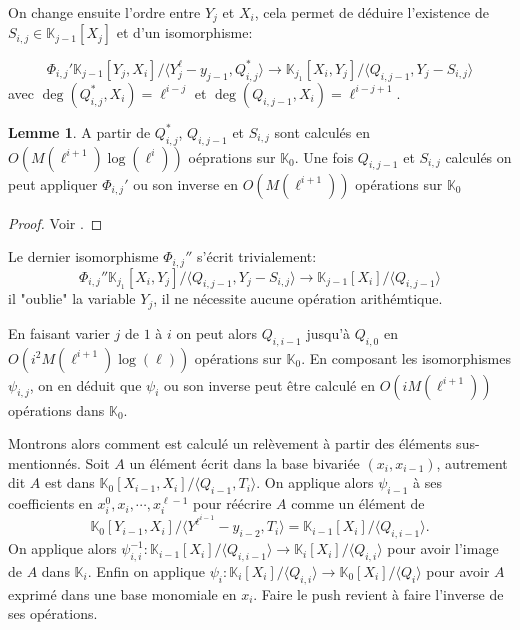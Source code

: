 \documentclass[10pt,a4paper]{book}
\theoremstyle{plain}
\theoremstyle{definition}
\newtheorem{lem}[thm]{Lemme}
\theoremstyle{definition}
\theoremstyle{definition}
\theoremstyle{definition}
\theoremstyle{remark}
\theoremstyle{remark}
\begin{document}
On change ensuite l'ordre entre $Y_j$ et $X_i$, cela permet de déduire l'existence de $S_{i,j} \in \mathbb{K}_{j-1}[X_j]$ et d'un isomorphisme:

\begin{equation*}
\Phi_{i,j}' \mathbb{K}_{j-1}[Y_j,X_i]/ \langle Y_j^{\ell}-y_{j-1},Q_{i,j}^* \rangle \to \mathbb{K}_{j_1}[X_i,Y_j]/\langle Q_{i,j-1}, Y_j-S_{i,j}\rangle
\end{equation*}
avec $\deg(Q_{i,j}^*,X_i)=\ell^{i-j}$ et $\deg(Q_{i,j-1},X_i)=\ell^{i-j+1}$.

\begin{lem}
A partir de $Q_{i,j}^*$, $Q_{i,j-1}$ et $S_{i,j}$ sont calculés en $O(M(\ell^{i+1})\log(\ell^i))$ oéprations sur $\mathbb{K}_0$. Une fois  $Q_{i,j-1}$ et $S_{i,j}$ calculés on peut appliquer $\Phi_{i,j}'$ ou son inverse en $O(M(\ell^{i+1}))$ opérations sur $\mathbb{K}_0$
\end{lem}

\begin{proof}
Voir \cite{DeFeo-Doliskani-Schost13}.
\end{proof}

Le dernier isomorphisme $\Phi_{i,j}''$ s'écrit trivialement:
\begin{equation*}
\Phi_{i,j}'' \mathbb{K}_{j_1}[X_i,Y_j]/\langle Q_{i,j-1}, Y_j-S_{i,j}\rangle \to \mathbb{K}_{j-1}[X_i]/\langle Q_{i,j-1} \rangle 
\end{equation*}
il "oublie" la variable $Y_j$, il ne nécessite aucune opération arithémtique.

En faisant varier $j$ de $1$ à $i$ on peut alors $Q_{i,i-1}$ jusqu'à $Q_{i,0}$ en $O(i^2M(\ell^{i+1})\log(\ell))$ opérations sur $\mathbb{K}_0$. En composant les isomorphismes $\psi_{i,j}$, on en déduit que $\psi_i$ ou son inverse peut être calculé en $O(iM(\ell^{i+1}))$ opérations dans $\mathbb{K}_0$.

Montrons alors comment est calculé un relèvement à partir des éléments sus-mentionnés. Soit $A$ un élément écrit dans la base bivariée $(x_i,x_{i-1})$, autrement dit $A$ est dans $\mathbb{K}_0[X_{i-1},X_i]/\langle Q_{i-1}, T_{i} \rangle$. On applique alors $\psi_{i-1}$ à ses coefficients en $x_i^0,x_i,\cdots, x_i^{\ell-1}$ pour réécrire $A$ comme un élément de
\begin{equation*}
\mathbb{K}_0[Y_{i-1},X_i]/\langle Y^{\ell^{i-1}}-y_{i-2},T_i \rangle = \mathbb{K}_{i-1}[X_i]/\langle Q_{i,i-1} \rangle.
\end{equation*}
On applique alors $\psi_{i,i}^{-1}:\mathbb{K}_{i-1}[X_i]/\langle Q_{i,i-1} \rangle \to \mathbb{K}_i[X_i]/\langle Q_{i,i} \rangle$ pour avoir l'image de $A$ dans $\mathbb{K}_i$. Enfin on applique $\psi_{i}:\mathbb{K}_i[X_i]/\langle Q_{i,i} \rangle \to \mathbb{K}_0[X_i]/ \langle Q_i \rangle $ pour avoir $A$ exprimé dans une base monomiale en $x_i$. Faire le push revient à faire l'inverse de ses opérations.
\end{document}
